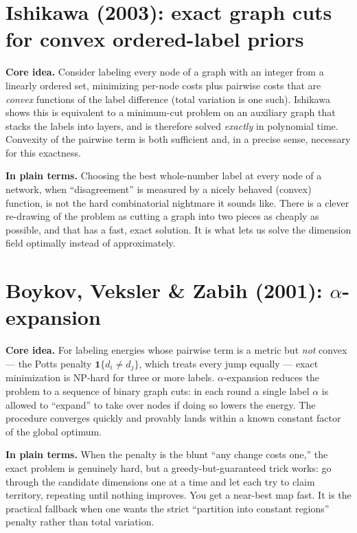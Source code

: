 \documentclass[11pt]{article}
\theoremstyle{definition}
\theoremstyle{remark}
\begin{document}
\section{Ishikawa (2003): exact graph cuts for convex ordered-label priors}
\label{app:ishikawa}
\textbf{Core idea.} Consider labeling every node of a graph with an integer from a
linearly ordered set, minimizing per-node costs plus pairwise costs that are
\emph{convex} functions of the label difference (total variation is one such).
Ishikawa shows this is equivalent to a minimum-cut problem on an auxiliary graph
that stacks the labels into layers, and is therefore solved \emph{exactly} in
polynomial time. Convexity of the pairwise term is both sufficient and, in a
precise sense, necessary for this exactness.

\textbf{In plain terms.} Choosing the best whole-number label at every node of a
network, when ``disagreement'' is measured by a nicely behaved (convex) function,
is not the hard combinatorial nightmare it sounds like. There is a clever
re-drawing of the problem as cutting a graph into two pieces as cheaply as
possible, and that has a fast, exact solution. It is what lets us solve the
dimension field optimally instead of approximately.

\section{Boykov, Veksler \& Zabih (2001): $\alpha$-expansion}
\label{app:bvz}
\textbf{Core idea.} For labeling energies whose pairwise term is a metric but
\emph{not} convex --- the Potts penalty $\mathbf{1}\{d_i\neq d_j\}$, which treats
every jump equally --- exact minimization is NP-hard for three or more labels.
$\alpha$-expansion reduces the problem to a sequence of binary graph cuts: in each
round a single label $\alpha$ is allowed to ``expand'' to take over nodes if doing
so lowers the energy. The procedure converges quickly and provably lands within a
known constant factor of the global optimum.

\textbf{In plain terms.} When the penalty is the blunt ``any change costs one,''
the exact problem is genuinely hard, but a greedy-but-guaranteed trick works: go
through the candidate dimensions one at a time and let each try to claim territory,
repeating until nothing improves. You get a near-best map fast. It is the practical
fallback when one wants the strict ``partition into constant regions'' penalty
rather than total variation.
\end{document}

